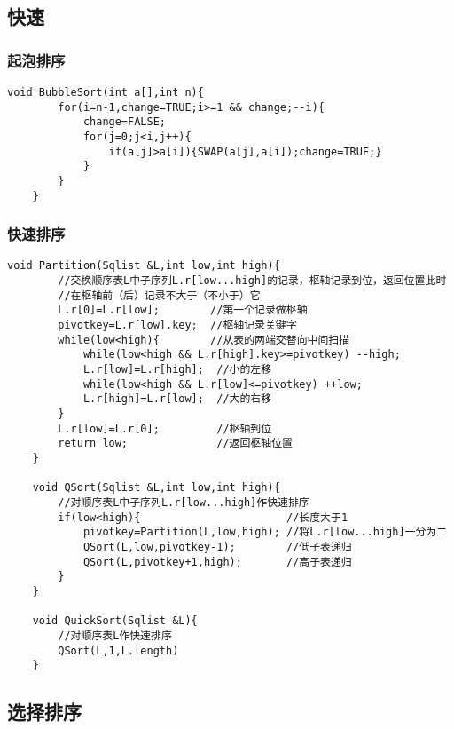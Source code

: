 \documentclass[UTF8]{ctexart}
\begin{document}
 

\subsection{快速}
\subsubsection{起泡排序}

\begin{lstlisting}[style=v1]
    void BubbleSort(int a[],int n){
        for(i=n-1,change=TRUE;i>=1 && change;--i){
            change=FALSE;
            for(j=0;j<i,j++){
                if(a[j]>a[i]){SWAP(a[j],a[i]);change=TRUE;}
            }
        }
    }
\end{lstlisting}



\subsubsection{快速排序}
 
\begin{lstlisting}[style=v1]
    void Partition(Sqlist &L,int low,int high){
        //交换顺序表L中子序列L.r[low...high]的记录，枢轴记录到位，返回位置此时
        //在枢轴前（后）记录不大于（不小于）它
        L.r[0]=L.r[low];        //第一个记录做枢轴
        pivotkey=L.r[low].key;  //枢轴记录关键字
        while(low<high){        //从表的两端交替向中间扫描
            while(low<high && L.r[high].key>=pivotkey) --high;
            L.r[low]=L.r[high];  //小的左移
            while(low<high && L.r[low]<=pivotkey) ++low;
            L.r[high]=L.r[low];  //大的右移   
        }
        L.r[low]=L.r[0];         //枢轴到位  
        return low;              //返回枢轴位置  
    }

    void QSort(Sqlist &L,int low,int high){
        //对顺序表L中子序列L.r[low...high]作快速排序
        if(low<high){                       //长度大于1
            pivotkey=Partition(L,low,high); //将L.r[low...high]一分为二
            QSort(L,low,pivotkey-1);        //低子表递归
            QSort(L,pivotkey+1,high);       //高子表递归
        }
    }

    void QuickSort(Sqlist &L){
        //对顺序表L作快速排序
        QSort(L,1,L.length)
    }

\end{lstlisting}
 
\subsection{选择排序}
 
\end{document}
